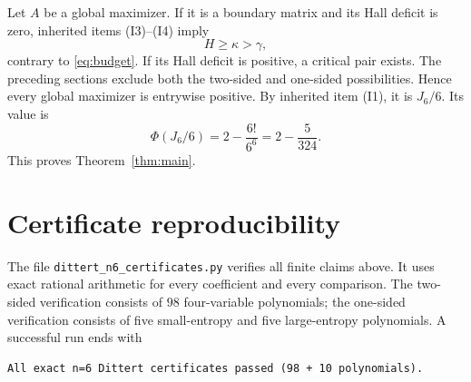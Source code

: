 \documentclass[11pt]{article}
\theoremstyle{definition}
\newcommand{\g}{\gamma}
\begin{document}
Let $A$ be a global maximizer.  If it is a boundary matrix and its Hall
deficit is zero, inherited items (I3)--(I4) imply
\[
 H\ge\kappa>\g,
\]
contrary to \eqref{eq:budget}.  If its Hall deficit is positive, a critical
pair exists.  The preceding sections exclude both the two-sided and
one-sided possibilities.  Hence every global maximizer is entrywise positive.
By inherited item (I1), it is $J_6/6$.  Its value is
\[
 \Phi(J_6/6)=2-\frac{6!}{6^6}=2-\frac5{324}.
\]
This proves Theorem~\ref{thm:main}.

\section*{Certificate reproducibility}

The file \texttt{dittert\_n6\_certificates.py} verifies all finite claims
above.  It uses exact rational arithmetic for every coefficient and every
comparison.  The two-sided verification consists of $98$ four-variable
polynomials; the one-sided verification consists of five small-entropy and
five large-entropy polynomials.  A successful run ends with
\begin{verbatim}
All exact n=6 Dittert certificates passed (98 + 10 polynomials).
\end{verbatim}
\end{document}
